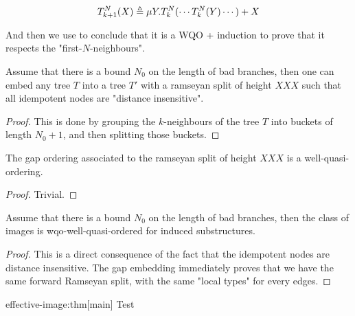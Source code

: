 
\begin{equation*}
    T_{k+1}^N (X) \triangleq
    \mu Y. T_{k}^N( \cdots T_k^N(Y) \cdots ) + X
\end{equation*}

And then we use \cite{LOPEZ23} to conclude that it is a WQO + induction 
to prove that it respects the "first-$N$-neighbours".

\begin{lemma}
    Assume that there is a bound $N_0$ on the length of bad branches, then
    one can embed any tree $T$ into a tree $T'$ with a ramseyan split of height $XXX$
    such that all idempotent nodes are "distance insensitive".
\end{lemma}
\begin{proof}
    This is done by grouping the $k$-neighbours of the tree $T$ into buckets of length $N_0 + 1$, and then
    splitting those buckets. 
\end{proof}

\begin{lemma}
    The gap ordering associated to the ramseyan split of height $XXX$ is a well-quasi-ordering.
\end{lemma}
\begin{proof}
    Trivial. 
\end{proof}

\begin{theorem}
    Assume that there is a bound $N_0$ on the length of bad branches, then
    the class of images is wqo-well-quasi-ordered for induced substructures.
\end{theorem}
\begin{proof}
    This is a direct consequence of the fact that the idempotent nodes are distance insensitive.
    The gap embedding immediately proves that we have the same forward Ramseyan split,
    with the same "local types" for every edges.
\end{proof}


\begin{proofof}{effective-image:thm}[main]
    Test
\end{proofof}

